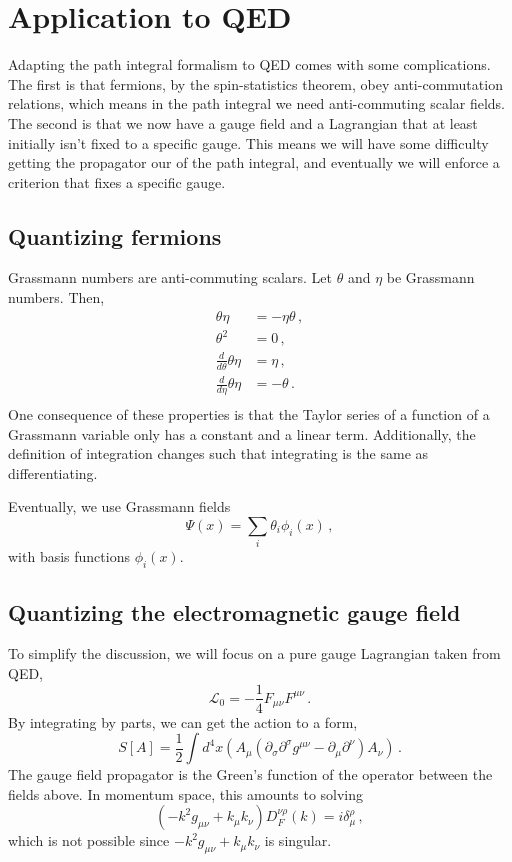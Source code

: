 \documentclass[12pt]{memoir}
\begin{document}
\section{Application to QED}

Adapting the path integral formalism to QED comes with some complications.
The first is that fermions, by the spin-statistics theorem, obey anti-commutation relations,
which means in the path integral we need anti-commuting scalar fields.
The second is that we now have a gauge field
and a Lagrangian that at least initially isn't fixed to a specific gauge.
This means we will have some difficulty getting the propagator our of the path integral,
and eventually we will enforce a criterion that fixes a specific gauge.

\subsection{Quantizing fermions}

Grassmann numbers are anti-commuting scalars.
Let $\theta$ and $\eta$ be Grassmann numbers.
Then,
\begin{align}
  \theta \eta & = - \eta \theta\,, \\
  \theta^2 & = 0\,, \\
  \frac{d}{d\theta}\theta\eta & = \eta\,,\\
  \frac{d}{d\eta}\theta\eta & = -\theta\,.\\
\end{align}
One consequence of these properties is that the Taylor series of a function of a Grassmann variable
only has a constant and a linear term.
Additionally, the definition of integration changes such that integrating is the same as differentiating.

Eventually, we use Grassmann fields
\begin{equation}
  \Psi(x) = \sum_i \theta_i \phi_i(x)\,,
\end{equation}
with basis functions $\phi_i(x)$.

\subsection{Quantizing the electromagnetic gauge field}

To simplify the discussion, we will focus on a pure gauge Lagrangian taken from QED,
\begin{equation}
  \mathcal{L}_0 = -\frac{1}{4} F_{\mu\nu}F^{\mu\nu}\,.
\end{equation}
By integrating by parts, we can get the action to a form,
\begin{equation}
  S[A] = \frac{1}{2}\int d^4 x (A_{\mu} (\partial_{\sigma} \partial^{\sigma} g^{\mu\nu} - \partial_{\mu} \partial^{\nu}) A_{\nu})\,.
\end{equation}
The gauge field propagator is the Green's function of the operator between the fields above.
In momentum space, this amounts to solving
\begin{equation}
  (-k^2 g_{\mu\nu} + k_{\mu} k_{\nu}) D_{F}^{\nu\rho}(k) = i \delta_{\mu}^{\rho}\,,
\end{equation}
which is not possible since $-k^2 g_{\mu\nu} + k_{\mu} k_{\nu}$ is singular.
\end{document}
